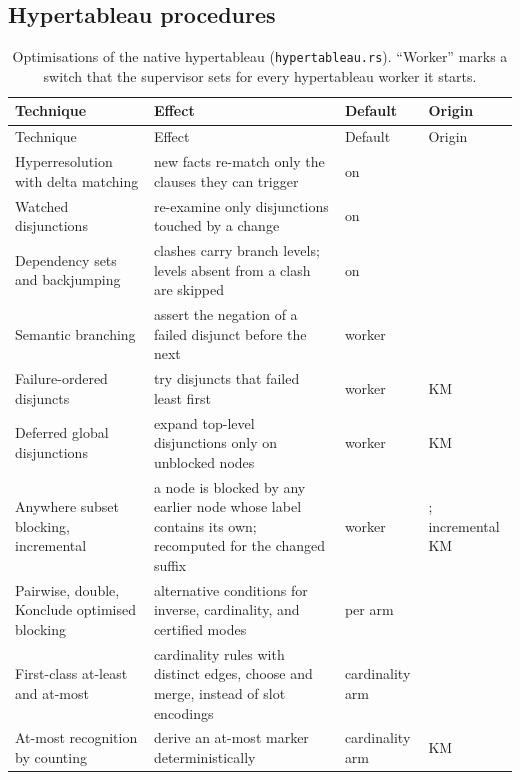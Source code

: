 \subsection{Hypertableau procedures}

\begin{small}
\begin{longtable}{@{}p{}p{}p{}p{}@{}}
\caption{Optimisations of the native hypertableau (\texttt{hypertableau.rs}).
``Worker'' marks a switch that the supervisor sets for every hypertableau
worker it starts.}
\label{tab:opt-ht}\\
\toprule
Technique & Effect & Default & Origin\\
\midrule
\endfirsthead
\toprule
Technique & Effect & Default & Origin\\
\midrule
\endhead
Hyperresolution with delta matching & new facts re-match only the clauses they can trigger & on & \cite{motik2009hypertableau,motik2007opt}\\
Watched disjunctions & re-examine only disjunctions touched by a change & on & \cite{moskewicz2001chaff}\\
Dependency sets and backjumping & clashes carry branch levels; levels absent from a clash are skipped & on & \cite{horrocks1999optimizing}\\
Semantic branching & assert the negation of a failed disjunct before the next & worker & \cite{horrocks1999optimizing}\\
Failure-ordered disjuncts & try disjuncts that failed least first & worker & KM\\
Deferred global disjunctions & expand top-level disjunctions only on unblocked nodes & worker & KM\\
Anywhere subset blocking, incremental & a node is blocked by any earlier node whose label contains its own; recomputed for the changed suffix & worker & \cite{motik2007opt,motik2009hypertableau}; incremental KM\\
Pairwise, double, Konclude optimised blocking & alternative conditions for inverse, cardinality, and certified modes & per arm & \cite{horrocks1999practical,horrocks2007shoiq,steigmiller2016thesis}\\
First-class at-least and at-most & cardinality rules with distinct edges, choose and merge, instead of slot encodings & cardinality arm & \cite{horrocks1999practical,steigmiller2014konclude}\\
At-most recognition by counting & derive an at-most marker deterministically & cardinality arm & KM\\

\end{longtable}
\end{small}
